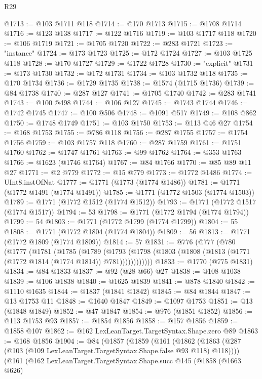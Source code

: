 \begin{lexlean}{R29}
\begin{coremodule}
@1713 := @103 @1711 @118
@1714 := @170 @1713
@1715 := @1708 @1714
@1716 := @123 @138
@1717 := @122 @1716
@1719 := @103 @1717 @118
@1720 := @106 @1719
@1721 := @1705 @1720
@1722 := @283 @1721
@1723 := "instance"
@1724 := @173 @1723
@1725 := @172 @1724
@1727 := @103 @1725 @118
@1728 := @170 @1727
@1729 := @1722 @1728
@1730 := "explicit"
@1731 := @173 @1730
@1732 := @172 @1731
@1734 := @103 @1732 @118
@1735 := @170 @1734
@1736 := @1729 @1735
@1738 := @1574 (@1715 @1736)
@1739 := @84 @1738
@1740 := @287 @127
@1741 := @1705 @1740
@1742 := @283 @1741
@1743 := @100 @498
@1744 := @106 @127
@1745 := @1743 @1744
@1746 := @1742 @1745
@1747 := @100 @506
@1748 := @1091 @517
@1749 := @108 @862
@1750 := @1748 @1749
@1751 := @103 @1750
@1753 := @113 @46 @27
@1754 := @168 @1753
@1755 := @786 @118
@1756 := @287 @1755
@1757 := @1754 @1756
@1759 := @103 @1757 @118
@1760 := @287 @1759
@1761 := @1751 @1760
@1762 := @1747 @1761
@1763 := @99 @1762
@1764 := @353 @1763
@1766 := @1623 (@1746 @1764)
@1767 := @84 @1766
@1770 := @85 @89 @11 @27
@1771 := @2 @779
@1772 := @15 @779
@1773 := @1772 @1486
@1774 := UInt8.instOfNat
@1777 := @1771 (@1773 (@1774 @1486))
@1781 := @1771 (@1772 @1491 (@1774 @1491))
@1785 := @1771 (@1772 @1503 (@1774 @1503))
@1789 := @1771 (@1772 @1512 (@1774 @1512))
@1793 := @1771 (@1772 @1517 (@1774 @1517))
@1794 := 53
@1798 := @1771 (@1772 @1794 (@1774 @1794))
@1799 := 54
@1803 := @1771 (@1772 @1799 (@1774 @1799))
@1804 := 55
@1808 := @1771 (@1772 @1804 (@1774 @1804))
@1809 := 56
@1813 := @1771 (@1772 @1809 (@1774 @1809))
@1814 := 57
@1831 := @776
    (@777
      (@780
        (@1777
          (@1781
            (@1785
              (@1789
                (@1793
                  (@1798 (@1803 (@1808 (@1813 (@1771 (@1772 @1814 (@1774 @1814)) @781))))))))))))
@1833 := @1770 (@775 @1831)
@1834 := @84 @1833
@1837 := @92 (@28 @66) @27
@1838 := @108 @1038
@1839 := @106 @1838
@1840 := @1625 @1839
@1841 := @878 @1840
@1842 := @1110 @1635
@1844 := @1837 (@1841 @1842)
@1845 := @84 @1844
@1847 := @13 @1753 @11
@1848 := @1640 @1847
@1849 := @1097 @1753
@1851 := @13 (@1848 @1849)
@1852 := @47 @1847
@1854 := @976 (@1851 @1852)
@1856 := @113 @1753 @93
@1857 := @1854 @1856
@1858 := @157 @1856
@1859 := @1858 @107
@1862 := @162 LexLeanTarget.TargetSyntax.Shape.zero @89
@1863 := @168 @1856
@1904 := @84
    (@1857
      (@1859
        (@161
          (@1862 (@1863 (@287 (@103 (@109 LexLeanTarget.TargetSyntax.Shape.false @93 @118) @118))))
          (@161
            (@162
              LexLeanTarget.TargetSyntax.Shape.succ
              @145
              (@1858
                (@1663 @626)

\end{coremodule}
\end{lexlean}
